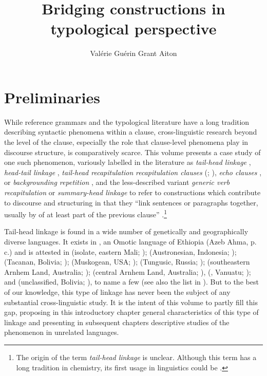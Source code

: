 \documentclass[output=paper]{LSP/langsci}
\author{
   Valérie Guérin\affiliation{James Cook University}\lastand
  Grant Aiton\affiliation{University of Alberta}
}
\title{Bridging constructions in typological perspective}
\begin{document}
\section{Preliminaries}
\label{GuAi1prelim}

While reference grammars and the typological literature have a long tradition describing syntactic phenomena within a clause, cross-linguistic research beyond the level of the clause, especially the role that clause-level phenomena play in discourse structure, is comparatively scarce. This volume presents a case study of one such phenomenon, variously labelled in the literature as \textit{tail-head linkage} \citep{devries.2005}, \textit{head-tail linkage} \citep[][163]{fabian98}, \textit{tail-head recapitulation} \citep[][197]{farr99} \textit{recapitulation clauses} (\citealt[][438]{Genetti.2007}; \citealt[][17]{stirling93}), \textit{echo clauses} \citep{Heath18}, or \textit{backgrounding repetition} \citep[][10]{McKay.2008}, and the less-described variant \textit{generic verb recapitulation} \citep[][204, 337]{farr99} or \textit{summary-head linkage} \citep[][274]{Thompson.et.al.2007} to refer to constructions which contribute to discourse  and structuring in that they ``link sentences or paragraphs together, usually by  of at least part of the previous clause'' \citep[][342]{Thurman1975}.\footnote{The origin of the term \textit{tail-head linkage} is unclear. Although this term has a long tradition in chemistry, its first usage in linguistics could be \citet{Longacre.1968}.}  

Tail-head linkage is found in a wide number of genetically and geographically diverse languages. It exists in , an Omotic language of Ethiopia (Azeb Ahma, p. c.) and is attested in  (isolate, eastern Mali; \citealt{Heath18});  (Austronesian, Indonesia; \citealt{Plattel2013});  (Tacanan, Bolivia; \citealt{Guillaume2011});  (Muskogean, USA; \citealt{Martin1998});  (Tungusic, Russia; \citealt{Grenoble2012});  (southeastern Arnhem Land, Australia; \citealt{heath1985});  (central Arnhem Land, Australia; \citealt{McKay.2008}),  (, Vanuatu; \citealt{brotchie09}); and  (unclassified, Bolivia; \citealt{vangijn14}), to name a few (see also the list in \citealt[][111]{Guillaume2011}). But to the best of our knowledge, this type of linkage has never been the subject of any substantial cross-linguistic study. It is the intent of this volume to partly fill this gap, proposing in this introductory chapter general characteristics of this type of linkage and presenting in subsequent chapters descriptive studies of the phenomenon in unrelated languages.
\end{document}
